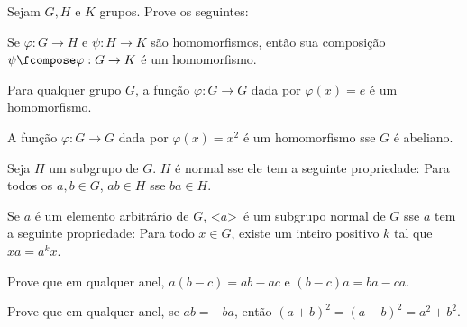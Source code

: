 Sejam $G, H$ e $K$ grupos. Prove os seguintes:

\begin{exercise}
	Se $\varphi: G \to H$ e $\psi: H \to K$ são homomorfismos, então sua composição $\psi \fcompose \varphi: G \to K$ é um homomorfismo.
\end{exercise}

\begin{exercise}
	Para qualquer grupo $G$, a função $\varphi: G \to G$ dada por $\varphi(x) = e$ é um homomorfismo.
\end{exercise}

\begin{exercise}
	A função $\varphi: G \to G$ dada por $\varphi(x) = x^2$ é um homomorfismo sse $G$ é abeliano.
\end{exercise}

\begin{exercise}
	Seja $H$ um subgrupo de $G$. $H$ é normal sse ele tem a seguinte propriedade:
	Para todos os $a, b \in G$, $ab \in H$ sse $ba \in H$.
\end{exercise}

\begin{exercise}
	Se $a$ é um elemento arbitrário de $G$, \textless $a$\textgreater \ é um subgrupo normal de $G$ sse $a$ tem a seguinte propriedade:
	Para todo $x \in G$, existe um inteiro positivo $k$ tal que $xa = a^k x$.
\end{exercise}

\begin{exercise}
	Prove que em qualquer anel, $a(b - c) = ab - ac$ e $(b - c)a = ba -ca$.
\end{exercise}

\begin{exercise}
	Prove que em qualquer anel, se $ab = -ba$, então $(a + b)^2 = (a - b)^2 = a^2 + b^2$.
\end{exercise}
